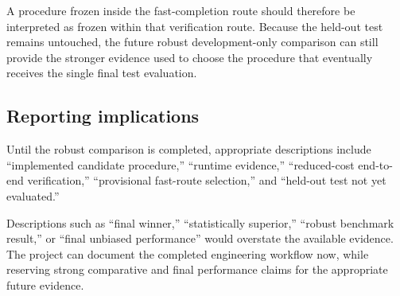 A procedure frozen inside the fast-completion route should therefore be interpreted as frozen within that verification route. Because the held-out test remains untouched, the future robust development-only comparison can still provide the stronger evidence used to choose the procedure that eventually receives the single final test evaluation.

\subsection{Reporting implications}

Until the robust comparison is completed, appropriate descriptions include ``implemented candidate procedure,'' ``runtime evidence,'' ``reduced-cost end-to-end verification,'' ``provisional fast-route selection,'' and ``held-out test not yet evaluated.''

Descriptions such as ``final winner,'' ``statistically superior,'' ``robust benchmark result,'' or ``final unbiased performance'' would overstate the available evidence. The project can document the completed engineering workflow now, while reserving strong comparative and final performance claims for the appropriate future evidence.
